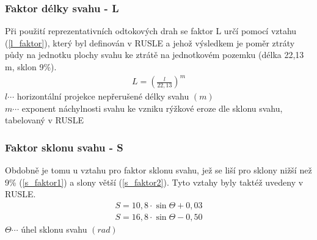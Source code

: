 \subsubsection{Faktor délky svahu - L} 
Při použití reprezentativních odtokových drah se faktor L určí pomocí
vztahu (\ref{l_faktor}), který byl definován v RUSLE\cite{rusle1997} a
jehož výsledkem je poměr ztráty půdy na jednotku plochy svahu ke
ztrátě na jednotkovém pozemku (délka 22,13 m, sklon
9\%).\cite{janecek2012}
\begin{align}
   \label{l_faktor} L=\left( \frac{l}{22,13} \right)^m
\end{align}
\hspace*{2cm}$l \cdots$ horizontální projekce nepřerušené délky svahu
$\left( m \right)$ \\
\hspace*{2cm}$m \cdots$ exponent náchylnosti svahu ke vzniku rýžkové
eroze dle sklonu svahu, tabelovaný v RUSLE\cite{rusle1997} \\
\subsubsection{Faktor sklonu svahu - S} 
Obdobně je tomu u vztahu pro faktor sklonu svahu, jež se liší pro
sklony nižší než 9\% (\ref{s_faktor1}) a slony větší
(\ref{s_faktor2}). Tyto vztahy byly taktéž uvedeny v
RUSLE\cite{rusle1997}.
\begin{align}
   \label{s_faktor1} S=10,8\cdot\sin\Theta + 0,03
\end{align}
\vspace{-40pt}
\begin{align}
   \label{s_faktor2} S=16,8\cdot\sin\Theta - 0,50
\end{align}
\hspace*{2cm}$\Theta \cdots$ úhel sklonu svahu $\left( rad \right)$

